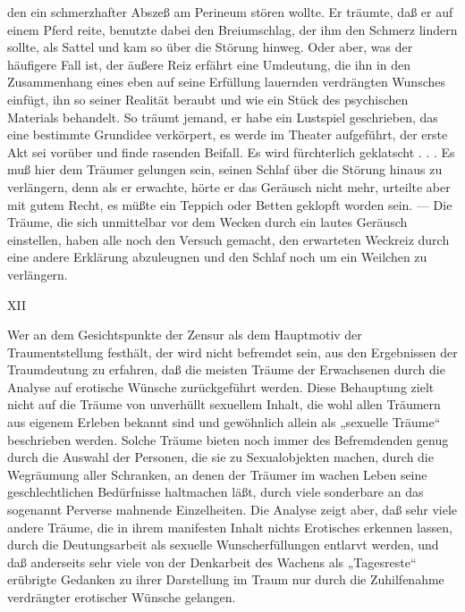 \documentclass{article}
\begin{document}
        \pstart
        den ein schmerzhafter Abszeß am Perineum stören wollte. Er träumte,
               daß er auf einem Pferd reite, benutzte dabei den Breiumschlag, der
               ihm den Schmerz lindern sollte, als Sattel und kam so über die Störung hinweg.
               Oder aber, was der häufigere Fall ist, der äußere Reiz erfährt eine Umdeutung,
               die ihn in den Zusammenhang eines eben auf seine Erfüllung lauernden
               verdrängten Wunsches einfügt, ihn so seiner Realität beraubt und wie ein Stück
               des psychischen Materials behandelt. So träumt jemand, er habe ein Lustspiel
               geschrieben, das eine bestimmte Grundidee verkörpert, es werde im Theater
               aufgeführt, der erste Akt sei vorüber und finde rasenden Beifall. Es wird
               fürchterlich geklatscht . . . Es muß hier dem Träumer gelungen sein, seinen
               Schlaf über die Störung hinaus zu verlängern, denn als er erwachte, hörte er das
               Geräusch nicht mehr, urteilte aber mit gutem Recht, es müßte ein Teppich oder
               Betten geklopft worden sein. — Die Träume, die sich unmittelbar vor dem
               Wecken durch ein lautes Geräusch einstellen, haben alle noch den Versuch
               gemacht, den erwarteten Weckreiz durch eine andere Erklärung abzuleugnen und den
               Schlaf noch um ein Weilchen zu verlängern.
        \pend
    
         
            
            
            
        \pstart
        XII
        \pend
    
            
        \pstart
        Wer an dem Gesichtspunkte der Zensur als dem Hauptmotiv der Traumentstellung festhält, der wird nicht befremdet
               sein, aus den Ergebnissen der Traumdeutung zu erfahren, daß die meisten Träume
               der Erwachsenen durch die Analyse auf
               erotische Wünsche zurückgeführt werden. Diese
               Behauptung zielt nicht auf die Träume von unverhüllt sexuellem Inhalt, die
               wohl allen Träumern aus eigenem Erleben bekannt sind und gewöhnlich allein als
               „sexuelle Träume“ beschrieben werden. Solche Träume bieten noch immer des
               Befremdenden genug durch die Auswahl der Personen, die sie zu
               Sexualobjekten machen, durch die Wegräumung aller Schranken, an denen der
               Träumer im wachen Leben seine geschlechtlichen Bedürfnisse haltmachen läßt,
               durch viele sonderbare an das sogenannt
               Perverse mahnende Einzelheiten. Die Analyse zeigt
               aber, daß sehr viele andere Träume, die in ihrem manifesten Inhalt nichts
               Erotisches erkennen lassen, durch die Deutungsarbeit als sexuelle
               Wunscherfüllungen entlarvt werden, und daß anderseits sehr viele von der
               Denkarbeit des Wachens als „Tagesreste“ erübrigte Gedanken zu ihrer
               Darstellung im Traum nur durch die Zuhilfenahme verdrängter
               erotischer Wünsche gelangen.
        \pend
    
\end{document}
